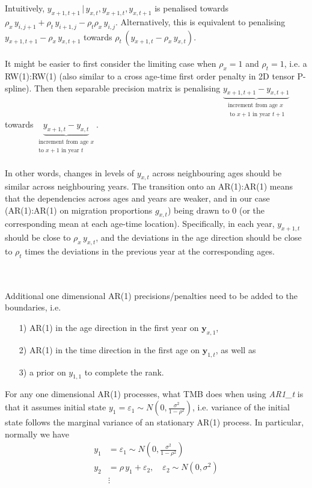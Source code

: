 \documentclass[12pt,a4paper]{article}
\begin{document}
Intuitively, $y_{x+1, t+1} \, \vert \, y_{x,t}, y_{x+1,t}, y_{x,t+1}$ is penalised towards $\rho_x \, y_{i, j+1} + \rho_t \, y_{i+1,j} - \rho_t \rho_x \, y_{i, j}$. Alternatively, this is equivalent to penalising $y_{x+1, t+1} - \rho_x \, y_{x, t+1}$ towards $\rho_t \, (y_{x+1, t} - \rho_x \, y_{x, t})$.
\\~\\
It might be easier to first consider the limiting case when $\rho_x = 1$ and $\rho_t = 1$, i.e. a RW(1):RW(1) (also similar to a cross age-time first order penalty in 2D tensor P-spline). Then then separable precision matrix is penalising $\underbrace{y_{x+1, t+1} - y_{x, t+1}}_\substack{\text{increment from age $x$} \\ \text{ to $x+1$ in year $t+1$}}$ towards $\underbrace{y_{x+1, t} - y_{x, t}}_\substack{\text{increment from age $x$} \\ \text{to $x+1$ in year $t$}}$. 
\\~\\
In other words, changes in levels of $y_{x,t}$ across neighbouring ages should be similar across neighbouring years. The transition onto an AR(1):AR(1) means that the dependencies across ages and years are weaker, and in our case (AR(1):AR(1) on migration proportions $g_{x,t}$) being drawn to 0 (or the corresponding mean at each age-time location). Specifically, in each year, $y_{x+1, t}$ should be close to $\rho_x \, y_{x,t}$, and the deviations in the age direction should be close to $\rho_t$ times the deviations in the previous year at the corresponding ages.

\\~\\
Additional one dimensional AR(1) precisions/penalties need to be added to the boundaries, i.e. 
\begin{itemize}
\item[1)] AR(1) in the age direction in the first year on $\boldsymbol{y}_{x,1}$,
\item[2)] AR(1) in the time direction in the first age on $\boldsymbol{y}_{1,t}$,  as well as 
\item[3)] a prior on $y_{1,1}$ to complete the rank.
\end{itemize}

For any one dimensional AR(1) processes, what TMB does when using \textit{AR1\_t} is that it assumes initial state $y_1 = \varepsilon_1 \sim N(0, \frac{\sigma^2}{1-\rho^2})$, i.e. variance of the initial state follows the marginal variance of an stationary AR(1) process. In particular, normally we have
\begin{align*}
y_1 &= \varepsilon_1 \sim N(0, \frac{\sigma^2}{1-\rho^2}) \\
y_2 &= \rho \, y_1 + \varepsilon_2, \quad \varepsilon_2 \sim N(0, \sigma^2) \\
&\vdots
\end{align*}
\end{document}
